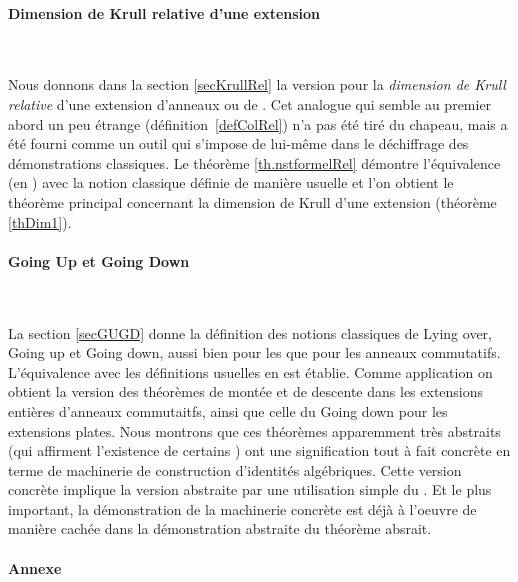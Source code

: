 \paragraph{Dimension de Krull relative d'une extension}~

\noindent Nous donnons dans  la section \ref{secKrullRel} la version  \cov
pour la \emph{dimension de Krull relative} d'une extension d'anneaux
ou de \trdis.
Cet analogue \cof qui semble au premier abord un peu étrange 
(définition~\ref{defColRel}) n'a pas été tiré du chapeau, mais a 
été fourni comme un outil qui s'impose
de lui-même dans le déchiffrage des démonstrations classiques.
Le théorème \ref{th.nstformelRel} démontre l'équivalence (en \clama) avec la notion classique 
définie de manière usuelle et l'on obtient \cot le théorème principal
concernant la dimension de Krull d'une extension (théorème \ref{thDim1}).

\paragraph{Going Up et Going Down}~


\noindent  La section \ref{secGUGD} donne la définition \cov des 
notions classiques de Lying over, Going up et Going down, aussi bien pour les \trdis que pour les anneaux commutatifs. L'équivalence avec les définitions usuelles en \clama est établie. Comme application on obtient la version \cov  des 
 théorèmes de montée et de descente 
dans les extensions entières d'anneaux commutaitfs, ainsi que celle du Going down pour les 
extensions plates.
Nous montrons que ces théorèmes apparemment très abstraits (qui 
affirment l'existence de certains \ideps) ont une signification tout à
fait concrète en terme de machinerie de construction d'identités 
algébriques. Cette version concrète implique la version abstraite par 
une utilisation simple du \tcg. Et le plus important, la démonstration de la 
machinerie concrète est déjà à l'oeuvre de manière cachée dans 
la démonstration abstraite du théorème absrait.

\paragraph{Annexe}~

